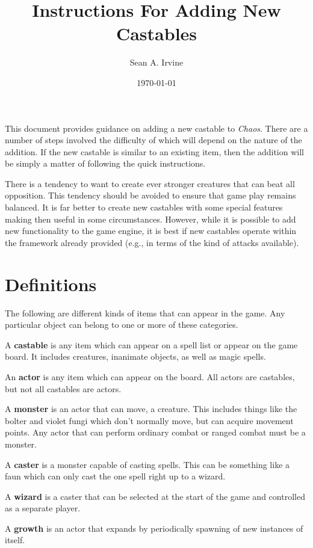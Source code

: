 \documentclass{article}
\title{Instructions For Adding New Castables}
\author{Sean A. Irvine}
\date{\today}
\begin{document}
\maketitle

This document provides guidance on adding a new castable to {\em Chaos}.  There are a number of steps involved the difficulty of which will depend on the nature of the addition.  If the new castable is similar to an existing item, then the addition will be simply a matter of following the quick instructions.

There is a tendency to want to create ever stronger creatures that can beat all opposition.  This tendency should be avoided to ensure that game play remains balanced.  It is far better to create new castables with some special features making then useful in some circumstances.  However, while it is possible to add new functionality to the game engine, it is best if new castables operate within the framework already provided (e.g., in terms of the kind of attacks available).

\section{Definitions}

The following are different kinds of items that can appear in the game. Any particular object can belong to one or more of these categories.

A {\bf castable} is any item which can appear on a spell list or appear on the game board. It includes creatures, inanimate objects, as well as magic spells.

An {\bf actor} is any item which can appear on the board. All actors are castables, but not all castables are actors.

A {\bf monster} is an actor that can move, a creature.  This includes things like the bolter and violet fungi which don't normally move, but can acquire movement points.  Any actor that can perform ordinary combat or ranged combat must be a monster.

A {\bf caster} is a monster capable of casting spells.  This can be something like a faun which can only cast the one spell right up to a wizard.

A {\bf wizard} is a caster that can be selected at the start of the game and controlled as a separate player.

A {\bf growth} is an actor that expands by periodically spawning of new instances of itself.
\end{document}
